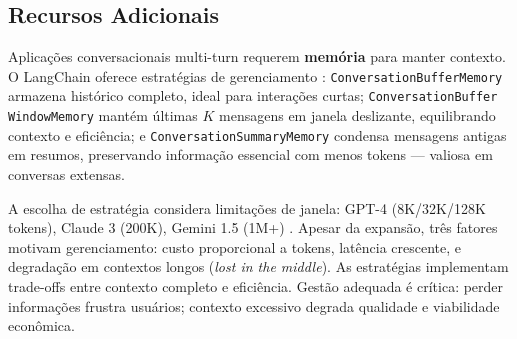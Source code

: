 \documentclass[12pt]{article}
\begin{document}
\subsection{Recursos Adicionais}
\label{subsec:recursos-adicionais}


Aplicações conversacionais multi-turn requerem \textbf{memória} para manter contexto. O LangChain oferece estratégias de gerenciamento \cite{langchain2023docs}: \texttt{ConversationBufferMemory} armazena histórico completo, ideal para interações curtas; \texttt{ConversationBuffer WindowMemory} mantém últimas $K$ mensagens em janela deslizante, equilibrando contexto e eficiência; e \texttt{ConversationSummaryMemory} condensa mensagens antigas em resumos, preservando informação essencial com menos tokens — valiosa em conversas extensas.


A escolha de estratégia considera limitações de janela: GPT-4 (8K/32K/128K tokens), Claude 3 (200K), Gemini 1.5 (1M+) \cite{openai2023gpt4, anthropic2023claude}. Apesar da expansão, três fatores motivam gerenciamento: custo proporcional a tokens, latência crescente, e degradação em contextos longos (\textit{lost in the middle}). As estratégias implementam trade-offs entre contexto completo e eficiência. Gestão adequada é crítica: perder informações frustra usuários; contexto excessivo degrada qualidade e viabilidade econômica.

\end{document}
